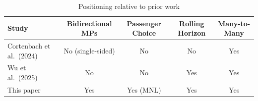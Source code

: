 \begin{table}[h]
\centering
\caption{Positioning relative to prior work}
\label{tab:literature-gap}
\begin{tabular}{lcccc}
\toprule
Study & Bidirectional MPs & Passenger Choice & Rolling Horizon & Many-to-Many \\
\midrule
Cortenbach et al.\ (2024) & No (single-sided) & No & No & Yes \\
Wu et al.\ (2025)         & No                & No & Yes & Yes \\
This paper                & Yes               & Yes (MNL) & Yes & Yes \\
\bottomrule
\end{tabular}
\end{table}
